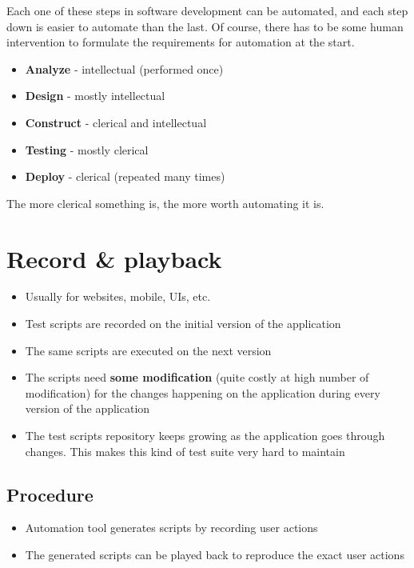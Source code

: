 \documentclass[12pt]{book}
\begin{document}
Each one of these steps in software development can be automated, and each step down is easier to automate than the last. Of course, there has to be some human intervention to formulate the requirements for automation at the start.

\begin{itemize}
    \item \textbf{Analyze} - intellectual (performed once)
    \item \textbf{Design} - mostly intellectual
    \item \textbf{Construct} - clerical and intellectual
    \item \textbf{Testing} - mostly clerical
    \item \textbf{Deploy} - clerical (repeated many times)
\end{itemize}

The more clerical something is, the more worth automating it is.

\section*{Record \& playback}

\begin{itemize}
    \item Usually for websites, mobile, UIs, etc.
    \item Test scripts are recorded on the initial version of the application
    \item The same scripts are executed on the next version
    \item The scripts need \textbf{some modification} (quite costly at high number of modification) for the changes happening on the application during every version of the application
    \item The test scripts repository keeps growing as the application goes through changes. This makes this kind of test suite very hard to maintain
\end{itemize}

\subsection*{Procedure}
\begin{itemize}
    \item Automation tool generates scripts by recording user actions
    \item The generated scripts can be played back to reproduce the exact user actions
\end{itemize}
\end{document}
